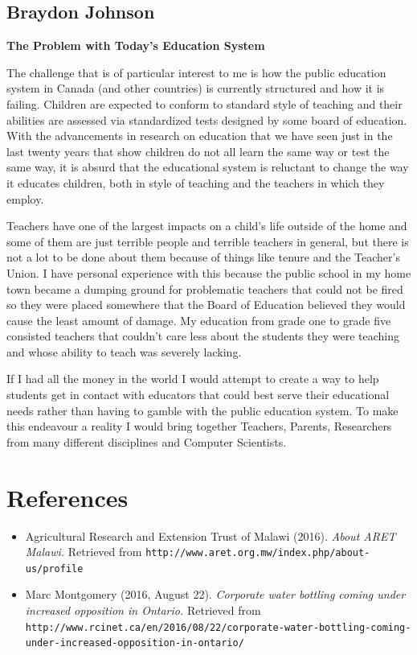\documentclass[12pt,letterpaper]{article}
\begin{document}
\subsection{Braydon Johnson}
\textbf{The Problem with Today's Education System}\par
The challenge that is of particular interest to me is how the public education system in Canada (and other countries) is currently structured and how it is failing. Children are expected to conform to standard style of teaching and their abilities are assessed via standardized tests designed by some board of education. With the advancements in research on education that we have seen just in the last twenty years that show children do not all learn the same way or test the same way, it is absurd that the educational system is reluctant to change the way it educates children, both in style of teaching and the teachers in which they employ.\par
Teachers have one of the largest impacts on a child's life outside of the home and some of them are just terrible people and terrible teachers in general,  but there is not a lot to be done about them because of things like tenure and the Teacher's Union. I have personal experience with this because the public school in my home town became a dumping ground for problematic teachers that could not be fired so they were placed somewhere that the Board of Education believed they would cause the least amount of damage. My education from grade one to grade five consisted teachers that couldn't care less about the students they were teaching and whose ability to teach was severely lacking.\par
If I had all the money in the world I would attempt to create a way to help students get in contact with educators that could best serve their educational needs rather than having to gamble with the public education system. To make this endeavour a reality I would bring together Teachers, Parents, Researchers from many different disciplines and Computer Scientists.

\clearpage
\section{References}

\begin{itemize}[leftmargin=12pt]
\item Agricultural Research and Extension Trust of Malawi (2016). \emph{About ARET Malawi.}
Retrieved from \texttt{http://www.aret.org.mw/index.php/about-us/profile}

\item Marc Montgomery (2016, August 22). \emph{Corporate water bottling coming under increased opposition in Ontario.} Retrieved from\\ \texttt{http://www.rcinet.ca/en/2016/08/22/corporate-water-bottling-coming-under-increased-opposition-in-ontario/}

\end{itemize}
\end{document}
